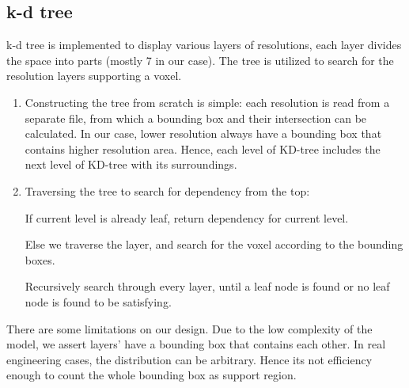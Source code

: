 \documentclass[acmtog]{acmart}
\begin{document}
    \subsection{k-d tree}\label{subsec:k-d-tree}
    k-d tree is implemented to display various layers of resolutions, each layer divides the space into parts (mostly 7 in our case).
    The tree is utilized to search for the resolution layers supporting a voxel.
    \begin{enumerate}
        \item Constructing the tree from scratch is simple: each resolution is read from a separate file, from which a bounding box and their intersection can be calculated. In our case, lower resolution always have a bounding box that contains higher resolution area. Hence, each level of KD-tree includes the next level of KD-tree with its surroundings.
        \item Traversing the tree to search for dependency from the top:
        \par If current level is already leaf, return dependency for current level.
        \par Else we traverse the layer, and search for the voxel according to the bounding boxes.
        \par Recursively search through every layer, until a leaf node is found or no leaf node is found to be satisfying.
    \end{enumerate}
    There are some limitations on our design. Due to the low complexity of the model, we assert layers' have a bounding box that contains each other.
    In real engineering cases, the distribution can be arbitrary. Hence its not efficiency enough to count the whole bounding box as support region.
\end{document}
